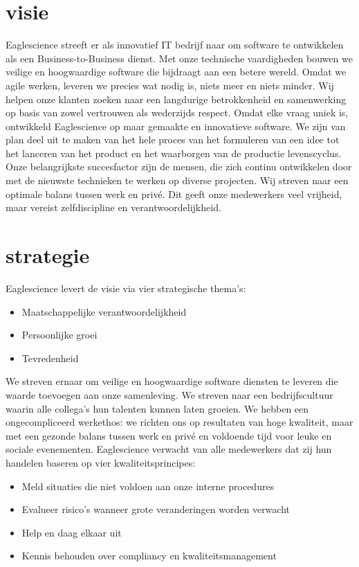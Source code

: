 \section{visie}
Eaglescience streeft er als innovatief IT bedrijf naar om software te ontwikkelen als een Business-to-Business dienst. Met onze technische vaardigheden bouwen we veilige en hoogwaardige software die bijdraagt aan een betere wereld. Omdat we agile werken, leveren we precies wat nodig is, niets meer en niets minder. Wij helpen onze klanten zoeken naar een langdurige betrokkenheid en samenwerking op basis van zowel vertrouwen als wederzijds respect. Omdat elke vraag uniek is, ontwikkeld Eaglescience op maar gemaakte en innovatieve software. We zijn van plan deel uit te maken van het hele proces van het formuleren van een idee tot het lanceren van het product en het waarborgen van de productie levenscyclus. Onze belangrijkste succesfactor zijn de mensen, die zich continu ontwikkelen door met de nieuwste technieken te werken op diverse projecten. Wij streven naar een optimale balans tussen werk en priv\'e. Dit geeft onze medewerkers veel vrijheid, maar vereist zelfdiscipline en verantwoordelijkheid. 
\section{strategie}
Eaglescience levert de visie via vier strategische thema's:
\begin{itemize}
\item Maatschappelijke verantwoordelijkheid
\item Persoonlijke groei
\item Tevredenheid
\end{itemize}
We streven ernaar om veilige en hoogwaardige software diensten te leveren die waarde toevoegen aan onze samenleving. We streven naar een bedrijfscultuur waarin alle collega's hun talenten kunnen laten groeien. We hebben een ongecompliceerd werkethos: we richten ons op resultaten van hoge kwaliteit, maar met een gezonde balans tussen werk en priv\'e en voldoende tijd voor leuke en sociale evenementen. Eaglescience verwacht van alle medewerkers dat zij hun handelen baseren op vier kwaliteitsprincipes:
\begin{itemize}
\item Meld situaties die niet voldoen aan onze interne procedures
\item Evalueer risico's wanneer grote veranderingen worden verwacht
\item Help en daag elkaar uit
\item Kennis behouden over compliancy en kwaliteitsmanagement
\end{itemize} 
